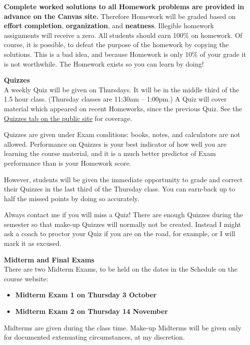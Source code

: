 \documentclass[12pt]{article}
\renewcommand{\emph}[1]{\textsf{\textbf{#1}}}
\newcommand{\localhead}[1]{\par\smallskip\textbf{#1} \smallskip\nobreak\\}%
\def\heading#1{\localhead{\large\emph{#1}}}
\begin{document}
\emph{Complete worked solutions to all Homework problems are provided
in advance on the Canvas site.}  Therefore Homework will be graded
based on \emph{effort} \emph{completion}, \emph{organization}, and
\emph{neatness}.  Illegible homework assignments will receive a
zero. All students should
earn 100\% on homework.  Of course, it is possible, to defeat the
purpose of the homework by copying the solutions.  This is a bad idea,
and because Homework is only 10\% of your grade it is not worthwhile.
The Homework exists so you can learn by doing!



\heading{Quizzes}
A weekly Quiz will be given on Thursdays.  It will be in the middle
third of the 1.5 hour class.  (Thursday classes are 11:30am --
1:00pm.)  A Quiz will cover material which appeared on recent
Homeworks, since the previous Quiz.  See the
\href{https://uaf-math251.github.io/calc2/quizzes.html}{Quizzes tab on
the public site} for coverage.

Quizzes are given under Exam conditions: books, notes, and calculators
are not allowed.  Performance on Quizzes is your best indicator of how
well you are learning the course material, and it is a much better
predictor of Exam performance than is your Homework score.

However, students will be given the immediate opportunity to grade and
correct their Quizzes in the last third of the Thursday class.  You
can earn-back up to half the missed points by doing so accurately.

Always contact me if you will miss a Quiz!  There are enough Quizzes
during the semester so that make-up Quizzes will normally not be
created.  Instead I might ask a coach to proctor your Quiz if you are on
the road, for example, or I will mark it as excused.


\heading{Midterm and Final Exams}
There are two Midterm Exams, to be held on the dates in the Schedule on the course website:
\begin{itemize}
\item \emph{Midterm Exam 1 on Thursday 3 October}
\item \emph{Midterm Exam 2 on Thursday 14 November}
\end{itemize}
Midterms are given during the class time.  Make-up Midterms will be given only for documented extenuating circumstances, at my discretion.
\end{document}

